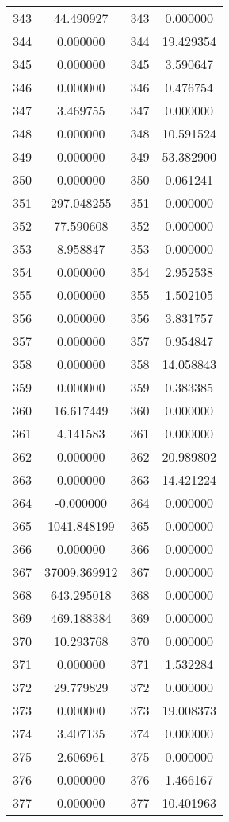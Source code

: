 \documentclass[12pt]{article}
\begin{document}
\begin{longtable}{@{}cccc@{}}
343 & 44.490927 & 343 & 0.000000 \\
344 & 0.000000 & 344 & 19.429354 \\
345 & 0.000000 & 345 & 3.590647 \\
346 & 0.000000 & 346 & 0.476754 \\
347 & 3.469755 & 347 & 0.000000 \\
348 & 0.000000 & 348 & 10.591524 \\
349 & 0.000000 & 349 & 53.382900 \\
350 & 0.000000 & 350 & 0.061241 \\
351 & 297.048255 & 351 & 0.000000 \\
352 & 77.590608 & 352 & 0.000000 \\
353 & 8.958847 & 353 & 0.000000 \\
354 & 0.000000 & 354 & 2.952538 \\
355 & 0.000000 & 355 & 1.502105 \\
356 & 0.000000 & 356 & 3.831757 \\
357 & 0.000000 & 357 & 0.954847 \\
358 & 0.000000 & 358 & 14.058843 \\
359 & 0.000000 & 359 & 0.383385 \\
360 & 16.617449 & 360 & 0.000000 \\
361 & 4.141583 & 361 & 0.000000 \\
362 & 0.000000 & 362 & 20.989802 \\
363 & 0.000000 & 363 & 14.421224 \\
364 & -0.000000 & 364 & 0.000000 \\
365 & 1041.848199 & 365 & 0.000000 \\
366 & 0.000000 & 366 & 0.000000 \\
367 & 37009.369912 & 367 & 0.000000 \\
368 & 643.295018 & 368 & 0.000000 \\
369 & 469.188384 & 369 & 0.000000 \\
370 & 10.293768 & 370 & 0.000000 \\
371 & 0.000000 & 371 & 1.532284 \\
372 & 29.779829 & 372 & 0.000000 \\
373 & 0.000000 & 373 & 19.008373 \\
374 & 3.407135 & 374 & 0.000000 \\
375 & 2.606961 & 375 & 0.000000 \\
376 & 0.000000 & 376 & 1.466167 \\
377 & 0.000000 & 377 & 10.401963 \\

\end{longtable}
\end{document}

